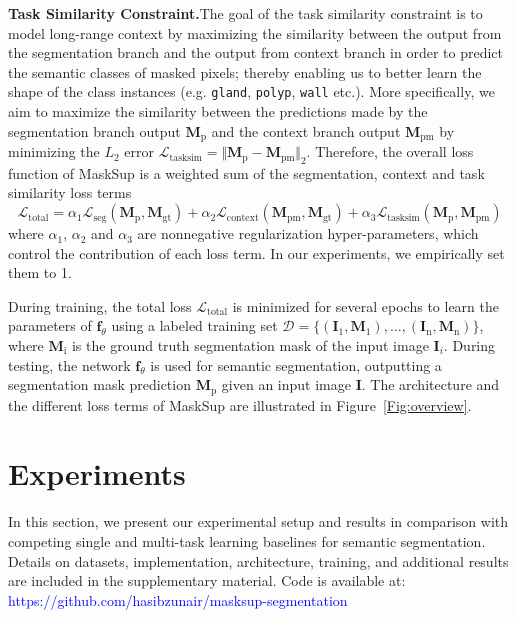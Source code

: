 \documentclass{bmvc2k}
\begin{document}
\medskip\noindent\textbf{Task Similarity Constraint.}\quad The goal of the task similarity constraint is to model long-range context by maximizing the similarity between the output from the segmentation branch and the output from context branch in order to predict the semantic classes of masked pixels; thereby enabling us to better learn the shape of the class instances (e.g. \texttt{gland}, \texttt{polyp}, \texttt{wall} etc.). More specifically, we aim to maximize the similarity between the predictions made by the segmentation branch output $\bm{M}_\text{p}$ and the context branch output $\bm{M}_\text{pm}$ by minimizing the $L_2$ error $\mathcal{L}_\text{tasksim}=\Vert\bm{M}_\text{p}-\bm{M}_\text{pm}\Vert_{2}$. Therefore, the overall loss function of MaskSup is a weighted sum of the segmentation, context and task similarity loss terms
\begin{equation}
\mathcal{L}_\text{total} = \alpha_{1} \mathcal{L}_\text{seg} (\bm{M}_\text{p}, \bm{M}_\text{gt}) + \alpha_{2} \mathcal{L}_\text{context} (\bm{M}_\text{pm}, \bm{M}_\text{gt}) + \alpha_{3} \mathcal{L}_\text{tasksim} (\bm{M}_\text{p}, \bm{M}_\text{pm})
\label{eq:loss2}
\end{equation}
where $\alpha_{1}$, $\alpha_{2}$ and $\alpha_{3}$ are nonnegative regularization hyper-parameters, which control the contribution of each loss term. In our experiments, we empirically set them to 1.

During training, the total loss $\mathcal{L}_\text{total}$ is minimized for several epochs to learn the parameters of $\bm{f}_{\theta}$ using a labeled training set $\mathcal{{D}}=\{(\bm{I}_\text{1},\bm{M}_\text{1}),\dots,(\bm{I}_\text{n},\bm{M}_\text{n})\}$, where $\bm{M}_\text{i}$ is the ground truth segmentation mask of the input image $\bm{I}_i$. During testing, the network $\bm{f}_{\theta}$ is used for semantic segmentation, outputting a segmentation mask prediction $\bm{M}_\text{p}$ given an input image $\bm{I}$. The architecture and the different loss terms of MaskSup are illustrated in Figure~\ref{Fig:overview}.

\section{Experiments}
In this section, we present our experimental setup and results in comparison with competing single and multi-task learning baselines for semantic segmentation. Details on datasets, implementation, architecture, training, and additional results are included in the supplementary material. Code is available at: \textcolor{blue}{https://github.com/hasibzunair/masksup-segmentation}
\end{document}
